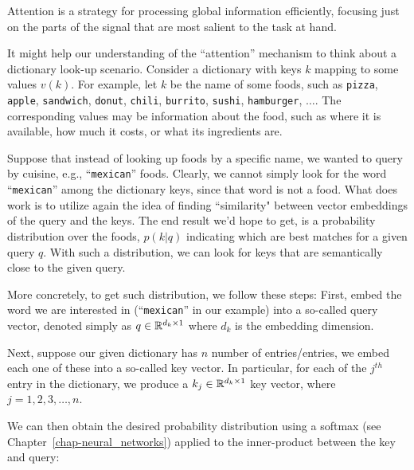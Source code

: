 
Attention is a strategy for processing global information efficiently, focusing just on the parts of the signal that are most salient to the task at hand.

It might help our understanding of the ``attention'' mechanism to think about a dictionary look-up scenario. Consider a dictionary with keys $k$ mapping to some values $v(k)$. For example, let $k$ be the name of some foods, such as {\tt pizza}, {\tt apple}, {\tt sandwich}, {\tt donut}, {\tt chili}, {\tt burrito}, {\tt sushi}, {\tt hamburger}, $\ldots$.   The corresponding values may be information about the food, such as where it is available, how much it costs, or what its ingredients are.

Suppose that instead of looking up foods by a specific name, we wanted to query by cuisine, e.g., ``{\tt mexican}'' foods. Clearly, we cannot simply look for the word ``{\tt mexican}'' among the dictionary keys, since that word is not a food.
What does work is to utilize again the idea of finding ``similarity" between vector embeddings of the query and the keys. The end result we'd hope to get, is a probability distribution over the foods, $p(k|q)$ indicating which are best matches for a given query $q$. With such a distribution, we can look for keys that are semantically close to the given query.

More concretely, to get such distribution, we follow these steps: First, embed the word we are interested in (``{\tt mexican}'' in our example) into a so-called query vector, denoted simply as $q \in \mathbb{R}^{d_k \times 1}$ where $d_k$ is the embedding dimension.

Next, suppose our given dictionary has $n$ number of entries/entries, we embed each one of these into a so-called key vector. In particular, for each of the $j^{th}$ entry in the dictionary, we produce a $k_j \in \mathbb{R}^{d_k\times 1}$ key vector, where $j=1,2,3, \dots, n.$

We can then obtain the desired probability distribution using a softmax (see Chapter~\ref{chap-neural_networks}) applied to the inner-product between the key and query:

